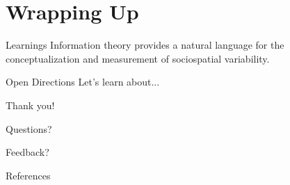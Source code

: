 \documentclass{beamer}
\begin{document}
\section{Wrapping Up}
	\begin{frame}{Learnings}
		Information theory provides a natural language for the conceptualization and measurement of sociospatial variability. 

	\end{frame}
	\iflong
	\begin{frame}{Open Directions}
		Let's learn about...
	\end{frame}
	\fi
	\begin{frame}[standout]
		Thank you! 

		Questions? 

		Feedback? 
	\end{frame}

\appendix


	\begin{frame}[allowframebreaks]{References}
	    
	    
	    
	    
	\end{frame}
\end{document}
